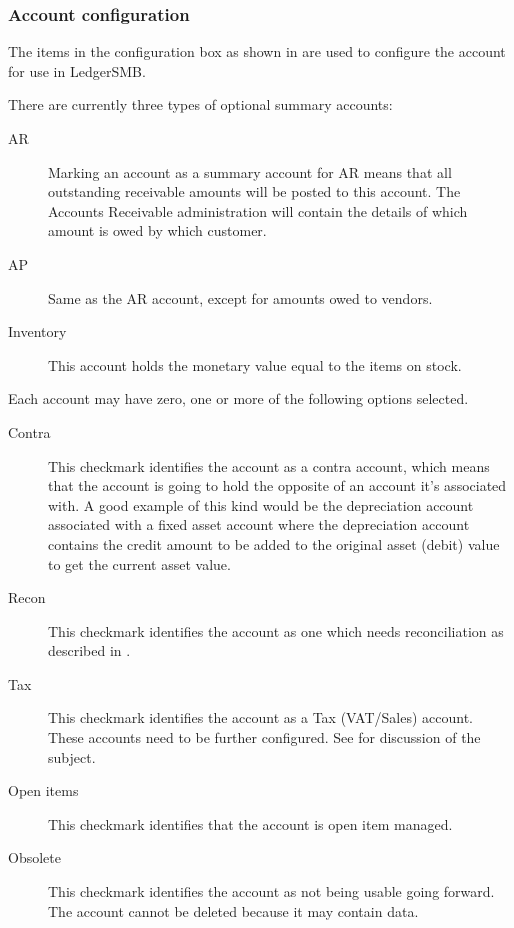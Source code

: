 \subsubsection{Account configuration}
\label{subsec-coa-account-configuration}

The items in the configuration box as shown in  are used to configure the account for use in LedgerSMB.

There are currently three types of optional summary accounts:

\begin{description}
    \item [AR] Marking an account as a summary account for AR means that all outstanding
    receivable amounts will be posted to this account. The Accounts Receivable administration
    will contain the details of which amount is owed by which \gls{customer}.
    \item [AP] Same as the AR account, except for amounts owed to vendors.
    \item [Inventory] This account holds the monetary value equal to the items on stock.
\end{description}

Each account may have zero, one or more of the following options selected.

\begin{description}
    \item[Contra] This checkmark identifies the account as a \gls{contra} account, which means
    that the account is going to hold the opposite of an account it's associated with.
    A good example of this kind would be the depreciation account associated with a fixed
    asset account where the depreciation account contains the credit amount to be added to
    the original asset (debit) value to get the current asset value.
    \item[Recon] This checkmark identifies the account as one which needs reconciliation as
    described in .
    \item[Tax] This checkmark identifies the account as a Tax (VAT/Sales) account. These accounts need
    to be further configured. See  for discussion of
    the subject.
    \item[Open items] This checkmark identifies that the account is
    \gls{open item managed}.
    \item[Obsolete] This checkmark identifies the account as not being usable going forward.  The account cannot be deleted because it may
    contain data.
    \label{item:AccountOptionsTax}
\end{description}


